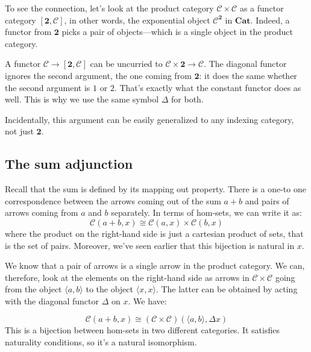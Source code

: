 \documentclass[DaoFP]{subfiles}
\begin{document}
To see the connection, let's look at the product category $\mathcal{C} \times \mathcal{C}$ as a functor category $[ \mathbf{2}, \mathcal{C}]$, in other words, the exponential object $\mathcal{C}^{ \mathbf{2}}$ in $\mathbf{Cat}$. Indeed, a functor from $\mathbf{2}$ picks a pair of objects---which is a single object in the product category.


A functor $\mathcal{C} \to [\mathbf{2}, \mathcal{C}]$ can be uncurried to $\mathcal{C} \times \mathbf{2} \to  \mathcal{C}$. The diagonal functor ignores the second argument, the one coming from $\mathbf{2}$: it does the same whether the second argument is $1$ or $2$. That's exactly what the constant functor does as well. This is why we use the same symbol $\Delta$ for both.

Incidentally, this argument can be easily generalized to any indexing category, not just $\mathbf{2}$.

\subsection{The sum adjunction}

Recall that the sum is defined by its mapping out property. There is a one-to one correspondence between the arrows coming out of the sum $a + b$ and pairs of arrows coming from $a$ and $b$ separately. In terms of hom-sets, we can write it as:
\[  \mathcal{C} (a + b, x) \cong \mathcal{C}( a , x) \times \mathcal{C}( b , x)\]
where the product on the right-hand side is just a cartesian product of sets, that is the set of pairs. Moreover, we've seen earlier that this bijection is natural in $x$.

We know that a pair of arrows is a single arrow in the product category. We can, therefore, look at the elements on the right-hand side as arrows in $\mathcal{C} \times \mathcal{C}$ going from the object $\langle a, b \rangle$ to the object $\langle x, x \rangle$. The latter can be obtained by acting with the diagonal functor $\Delta$ on $x$. We have:

\[  \mathcal{C} (a + b, x) \cong (\mathcal{C} \times \mathcal{C})( \langle a, b \rangle , \Delta x)\]
This is a bijection between hom-sets in two different categories. It satisfies naturality conditions, so it's a natural isomorphism. 
\end{document}
